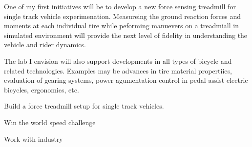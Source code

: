\documentclass{article}
\begin{document}
One of my first initiatives will be to develop a new force sensing treadmill
for single track vehicle experimenation. Measureing the ground reaction forces
and moments at each individual tire while peforming manuevers on a treadmiall
in  simulated environment will provide the next level of fidelity in
understanding the vehicle and rider dynamics.

The lab I envision will also support developments in all types of bicycle and
related technologies. Examples may be advances in tire material propertiies,
evaluation of gearing systems, power agumentation control in pedal assist
electric bicycles, ergonomics, etc.

Build a force treadmill setup for single track vehicles.

Win the world speed challenge

Work with industry






\end{document}
